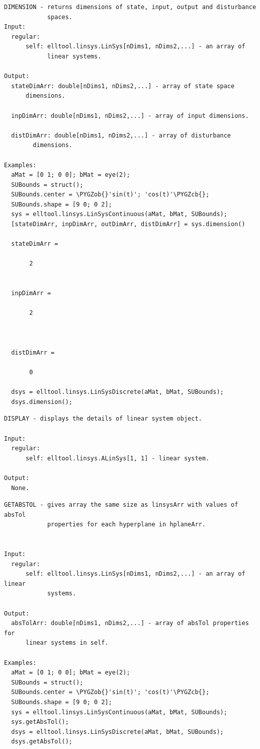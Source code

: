 \documentclass[letterpaper,10pt,english]{sphinxmanual}
\def\PYGZob{\char`\{}
\def\PYGZcb{\char`\}}
\begin{document}
\begin{Verbatim}[commandchars=\\\{\}]
DIMENSION - returns dimensions of state, input, output and disturbance
            spaces.
Input:
  regular:
      self: elltool.linsys.LinSys[nDims1, nDims2,...] - an array of
            linear systems.

Output:
  stateDimArr: double[nDims1, nDims2,...] - array of state space
      dimensions.

  inpDimArr: double[nDims1, nDims2,...] - array of input dimensions.

  distDimArr: double[nDims1, nDims2,...] - array of disturbance
        dimensions.

Examples:
  aMat = [0 1; 0 0]; bMat = eye(2);
  SUBounds = struct();
  SUBounds.center = \PYGZob{}'sin(t)'; 'cos(t)'\PYGZcb{};
  SUBounds.shape = [9 0; 0 2];
  sys = elltool.linsys.LinSysContinuous(aMat, bMat, SUBounds);
  [stateDimArr, inpDimArr, outDimArr, distDimArr] = sys.dimension()

  stateDimArr =

       2


  inpDimArr =

       2



  distDimArr =

       0

  dsys = elltool.linsys.LinSysDiscrete(aMat, bMat, SUBounds);
  dsys.dimension();
\end{Verbatim}

\begin{Verbatim}[commandchars=\\\{\}]
DISPLAY - displays the details of linear system object.

Input:
  regular:
      self: elltool.linsys.ALinSys[1, 1] - linear system.

Output:
  None.
\end{Verbatim}

\begin{Verbatim}[commandchars=\\\{\}]
GETABSTOL - gives array the same size as linsysArr with values of absTol
            properties for each hyperplane in hplaneArr.


Input:
  regular:
      self: elltool.linsys.LinSys[nDims1, nDims2,...] - an array of linear
            systems.

Output:
  absTolArr: double[nDims1, nDims2,...] - array of absTol properties for
      linear systems in self.

Examples:
  aMat = [0 1; 0 0]; bMat = eye(2);
  SUBounds = struct();
  SUBounds.center = \PYGZob{}'sin(t)'; 'cos(t)'\PYGZcb{};
  SUBounds.shape = [9 0; 0 2];
  sys = elltool.linsys.LinSysContinuous(aMat, bMat, SUBounds);
  sys.getAbsTol();
  dsys = elltool.linsys.LinSysDiscrete(aMat, bMat, SUBounds);
  dsys.getAbsTol();
\end{Verbatim}
\end{document}
